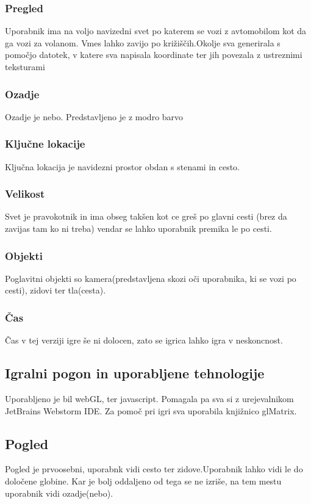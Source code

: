 \documentclass[a4paper]{article}
\begin{document}
\subsubsection{Pregled}
Uporabnik ima na voljo navizedni svet po katerem se vozi z avtomobilom kot da ga vozi za volanom. Vmes lahko zavijo po križiščih.Okolje sva generirala s pomočjo datotek, v katere sva napisala koordinate ter jih povezala z ustreznimi teksturami

\subsubsection{Ozadje}
Ozadje je nebo. Predstavljeno je z modro barvo

\subsubsection{Ključne lokacije}
Ključna lokacija je navidezni prostor obdan s stenami in cesto.


\subsubsection{Velikost}
Svet je pravokotnik in ima obseg takšen kot ce greš po glavni  cesti (brez da zavijas tam ko ni treba) vendar se lahko uporabnik premika le po cesti.

\subsubsection{Objekti}
Poglavitni objekti so kamera(predstavljena skozi oči uporabnika, ki se vozi po cesti), zidovi ter tla(cesta).

\subsubsection{Čas}
Čas v tej verziji igre še  ni dolocen, zato se igrica lahko igra v neskoncnost.

\subsection{Igralni pogon in uporabljene tehnologije}
Uporabljeno je bil webGL, ter javascript. Pomagala pa sva si z urejevalnikom JetBrains Webstorm IDE. Za pomoč pri igri sva uporabila knjižnico glMatrix.

\subsection{Pogled}
Pogled je prvoosebni, uporabnk  vidi cesto ter zidove.Uporabnik lahko vidi le do določene globine. Kar je bolj oddaljeno od tega se ne izriše, na tem mestu uporabnik vidi ozadje(nebo).
\end{document}
